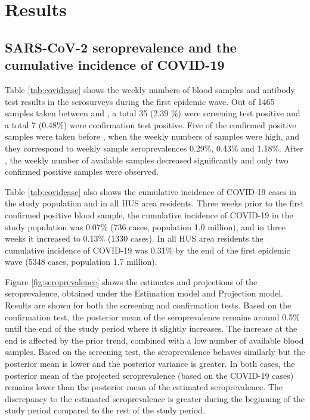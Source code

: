 \documentclass[aoas]{imsart}
\begin{document}
                                      
\section{Results} \label{seq:results}



\subsection{SARS-CoV-2 seroprevalence and the cumulative incidence of COVID-19}

Table \ref{tab:covidcase} shows the weekly numbers of blood samples and antibody test results in the serosurveys during the first epidemic wave. Out of 1465 samples taken between  and , a total 35 (2.39 \%) were screening test positive and a total 7 (0.48\%) were confirmation test positive. Five of the confirmed positive samples were taken before , when the weekly numbers of samples were high, and they correspond to weekly sample seroprevalences 0.29\%, 0.43\% and 1.18\%. After , the weekly number of available samples decreased significantly and only two confirmed positive samples were observed. 

Table \ref{tab:covidcase} also shows the cumulative incidence of COVID-19 cases in the study population and in all HUS area residents. Three weeks prior to the first confirmed positive blood sample, the cumulative incidence of COVID-19 in the study population was 0.07\% (736 cases, population 1.0 million), and in three weeks it increased to 0.13\% (1330 cases). In all HUS area residents the cumulative incidence of COVID-19 was 0.31\% by the end of the first epidemic wave (5348 cases, population 1.7 million).

Figure \ref{fig:seroprevalence} shows the estimates and projections of the seroprevalence, obtained under the Estimation model and Projection model. Results are shown for both the screening and confirmation tests. Based on the confirmation test, the posterior mean of the seroprevalence remains around 0.5\% until the end of the study period where it slightly increases. The increase at the end is affected by the prior trend, combined with a low number of available blood samples. Based on the screening test, the seroprevalence behaves similarly but the posterior mean is lower and the posterior variance is greater. In both cases, the posterior mean of the projected seroprevalence (based on the COVID-19 cases) remains lower than the posterior mean of the estimated seroprevalence. The discrepancy to the estimated seroprevalence is greater during the beginning of the study period compared to the rest of the study period.
\end{document}
